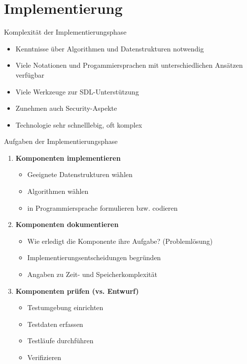 \section{Implementierung}

\begin{bonus}{Komplexität der Implementierungsphase}
    \begin{itemize}
        \item Kenntnisse über Algorithmen und Datenstrukturen notwendig
        \item Viele Notationen und Progammiersprachen mit unterschiedlichen Ansätzen verfügbar
        \item Viele Werkzeuge zur SDL-Unterstützung
        \item Zunehmen auch Security-Aspekte
        \item Technologie sehr schnelllebig, oft komplex
    \end{itemize}
\end{bonus}

\begin{defi}{Aufgaben der Implementierungsphase}
    \begin{enumerate}
        \item \textbf{Komponenten implementieren}
              \begin{itemize}
                  \item Geeignete Datenstrukturen wählen
                  \item Algorithmen wählen
                  \item in Programmiersprache formulieren bzw. codieren
              \end{itemize}
        \item \textbf{Komponenten dokumentieren}
              \begin{itemize}
                  \item Wie erledigt die Komponente ihre Aufgabe? (Problemlösung)
                  \item Implementierungsentscheidungen begründen
                  \item Angaben zu Zeit- und Speicherkomplexität
              \end{itemize}
        \item \textbf{Komponenten prüfen (vs. Entwurf)}
              \begin{itemize}
                  \item Testumgebung einrichten
                  \item Testdaten erfassen
                  \item Testläufe durchführen
                  \item Verifizieren
              \end{itemize}
    \end{enumerate}
\end{defi}

